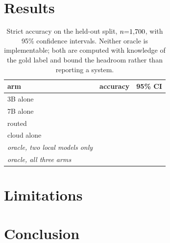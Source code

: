 \documentclass[11pt]{article}
\begin{document}
\section{Results}
\label{sec:long-results}


\begin{table}[ht]
\centering
\caption{Strict accuracy on the held-out split, $n{=}1{,}700{}$, with 95\% confidence
intervals. Neither oracle is implementable; both are computed with knowledge of the gold
label and bound the headroom rather than reporting a system.}
\label{tab:headline}
\begin{tabular}{lrr}
\toprule
arm & accuracy & 95\% CI \\
\midrule
3B alone                  & \accThreeB{}   & \accThreeBci{} \\
7B alone                  & \accSevenB{}   & \accSevenBci{} \\
routed                    & \accRouted{}   & \accRoutedci{} \\
cloud alone               & \accCloud{}    & \accCloudci{} \\
\midrule
\emph{oracle, two local models only} & \emph{\oracleLocalOnly{}} & \emph{\oracleLocalOnlyci{}} \\
\emph{oracle, all three arms}        & \emph{\oracleThreeWay{}}  & \emph{\oracleThreeWayci{}} \\
\bottomrule
\end{tabular}
\end{table}

\section{Limitations}
\label{sec:long-limitations}


\section{Conclusion}
\label{sec:long-conclusion}




\end{document}
